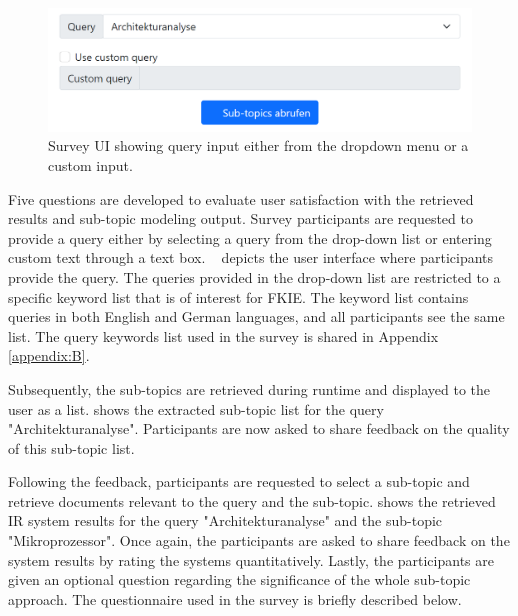 \begin{figure}[h]
	\centering
	\includegraphics[width=.8\textwidth]{images/survey/query_input.png}
	\caption[Query input from the user.]{Survey UI showing query input either from the dropdown menu or a custom input. \label{fig:survey_question_1}}
\end{figure}

Five questions are developed to evaluate user satisfaction with the retrieved results and sub-topic modeling output. Survey participants are requested to provide a query either by selecting a query from the drop-down list or entering custom text through a text box. ~ depicts the user interface where participants provide the query. The queries provided in the drop-down list are restricted to a specific keyword list that is of interest for \ac{FKIE}. The keyword list contains queries in both English and German languages, and all participants see the same list. The query keywords list used in the survey is shared in Appendix \ref{appendix:B}.



Subsequently, the sub-topics are retrieved during runtime and displayed to the user as a list.  shows the extracted sub-topic list for the query "Architekturanalyse". Participants are now asked to share feedback on the quality of this sub-topic list.


Following the feedback, participants are requested to select a sub-topic and retrieve documents relevant to the query and the sub-topic.   shows the retrieved \ac{IR} system results for the query "Architekturanalyse" and the sub-topic "Mikroprozessor". Once again, the participants are asked to share feedback on the system results by rating the systems quantitatively. Lastly, the participants are given an optional question regarding the significance of the whole sub-topic approach. The questionnaire used in the survey is briefly described below.


